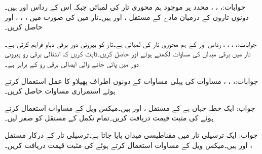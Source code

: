 جوابات:، ، ، 
محدد  پر موجود ہم محوری تار کی لمبائی  جبکہ اس کے رداس  اور  ہیں۔ دونوں تاروں کے درمیان مادے کے مستقل ،  اور  ہیں۔تار میں  کی صورت میں ، ، ،  اور  حاصل کریں۔

جوابات:، ، 
، ، 
رداس  اور  کے ہم محوری تار کی لمبائی  ہے۔تار  کو بیرونی دور  برقی دباو فراہم کرتی ہے۔تار میں برقی میدان  کی مساوات لکھتے ہوئے  اور  حاصل کریں۔ثابت کریں کہ انتقالی برقی رو بیرونی دور میں پائی جانے والی ایصالی برقی رو کے برابر ہے۔

جوابات:،
 ،
  ،
مساوات  کی پہلی مساوات کے دونوں اطراف پھیلاو کا عمل استعمال کرتے ہوئے  استمراری مساوات حاصل کریں۔

جواب: 
ایک خطہ جہاں  ہے کے مستقل ،  اور  ہیں۔میکس ویل کے مساوات استعمال کرتے ہوئے  کی مثبت قیمت دریافت کریں۔تمام تکمل کے مستقل کو صفر لیں۔

جواب:
ایک ترسیلی تار میں مقناطیسی میدان  پایا جاتا ہے۔ترسیلی تار کے درکار مستقل ،  اور  ہیں۔میکس ویل کے مساوات استعمال کرتے ہوئے  کی مثبت قیمت دریافت کریں۔

